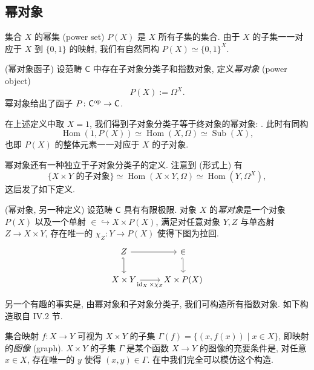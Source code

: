 \subsection{幂对象}

集合 $X$ 的幂集 (power set) $P(X)$ 是 $X$ 所有子集的集合. 由于 $X$ 的子集一一对应于 $X$ 到 $\{0,1\}$ 的映射,
我们有自然同构 $P(X)\simeq \{0,1\}^X$.

\begin{definition}
    [label={power-object-functor}]{(幂对象函子)}
    设范畴 $\mathsf C$ 中存在子对象分类子和指数对象, 定义\emph{幂对象} (power object)
    $$P(X) := \Omega^X.$$
    幂对象给出了函子 $P \colon \mathsf C^{\text{op}} \to \mathsf C$.
\end{definition}

在上述定义中取 $X=1$, 我们得到子对象分类子等于终对象的幂对象: .
此时有同构
$$
\operatorname{Hom}(1,P(X)) \simeq \operatorname{Hom}(X,\Omega) \simeq \operatorname{Sub}(X),
$$
也即 $P(X)$ 的整体元素一一对应于 $X$ 的子对象.

幂对象还有一种独立于子对象分类子的定义. 注意到 (形式上) 有
$$
\{X\times Y\text{ 的子对象}\} \simeq \operatorname{Hom}(X\times Y,\Omega) \simeq \operatorname{Hom}(Y,\Omega^X),
$$
这启发了如下定义.
\begin{definition}{(幂对象, 另一种定义)}
    设范畴 $\mathsf C$ 具有有限极限. 对象 $X$ 的\emph{幂对象}是一个对象 $P(X)$ 以及一个单射 $\in \hookrightarrow X \times P(X)$, 满足对任意对象 $Y,Z$ 与单态射 $Z \to X\times Y$, 存在唯一的 $\chi_Z \colon Y \to P(X)$ 使得下图为拉回.
\[\begin{tikzcd}[ampersand replacement=\&]
	Z \& \in \\
	{X\times Y} \& {X\times P(X)}
	\arrow[hook', from=1-1, to=2-1]
	\arrow["{\operatorname{id}_X \times \chi_Z}"', from=2-1, to=2-2]
	\arrow[from=1-1, to=1-2]
	\arrow[hook', from=1-2, to=2-2]
\end{tikzcd}\]
\end{definition}

另一个有趣的事实是, 由幂对象和子对象分类子, 我们可构造所有指数对象. 如下构造取自 \cite{SGL} IV.2 节.

集合映射 $f\colon X\to Y$ 可视为 $X\times Y$ 的子集 $\Gamma(f) = \{(x,f(x))\mid x\in X\}$, 即映射的\emph{图像} (graph). $X\times Y$ 的子集 $\Gamma$ 是某个函数 $X\to Y$ 的图像的充要条件是, 对任意 $x\in X$, 存在唯一的 $y$ 使得 $(x,y)\in \Gamma$.
在\topos{}中我们完全可以模仿这个构造.

